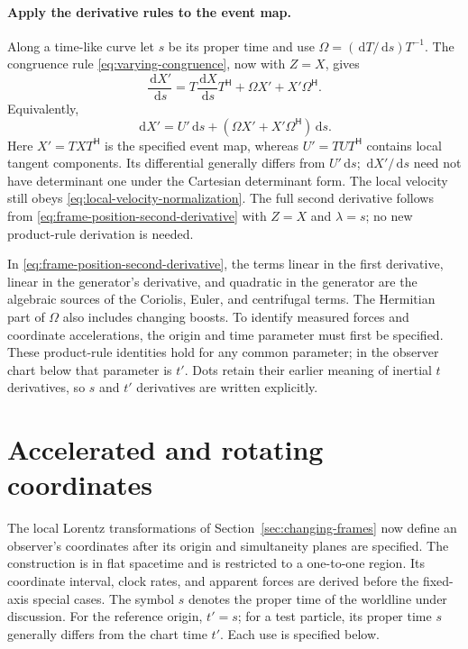 \documentclass[11pt]{article}
\newcommand{\pv}[1]{{#1}}
\newcommand{\pvGreek}[1]{{#1}}
\newcommand{\pT}{\pv{T}}
\newcommand{\pU}{\pv{U}}
\newcommand{\pX}{\pv{X}}
\newcommand{\pZ}{\pv{Z}}
\newcommand{\pvOmega}{\pvGreek{\Omega}}
\numberwithin{equation}{section}
\newcommand{\dd}{\,\mathrm d}
\begin{document}
\paragraph{Apply the derivative rules to the event map.}
Along a time-like curve let $s$ be its proper time and use
$\pvOmega=(\dd\pT/\dd s)\pT^{-1}$.
The congruence rule \eqref{eq:varying-congruence}, now with
$\pZ=\pX$, gives
\begin{equation}
 \frac{\dd\pX'}{\dd s}
 =\pT\frac{\dd\pX}{\dd s}\pT^{\mathsf H}
  +\pvOmega\pX'+\pX'\pvOmega^{\mathsf H}.
 \label{eq:frame-position-first-derivative}
\end{equation}
Equivalently,
\[
 \dd\pX'=\pU'\dd s
 +(\pvOmega\pX'+\pX'\pvOmega^{\mathsf H})\dd s.
\]
Here $\pX'=\pT\pX\pT^{\mathsf H}$ is the specified event map,
whereas $\pU'=\pT\pU\pT^{\mathsf H}$ contains local tangent
components. Its differential generally differs from $\pU'\dd s$;
$\dd\pX'/\dd s$ need not have determinant one under the Cartesian
determinant form. The local velocity still obeys
\eqref{eq:local-velocity-normalization}.
The full second derivative follows from
\eqref{eq:frame-position-second-derivative} with $\pZ=\pX$ and
$\lambda=s$; no new product-rule derivation is needed.

In \eqref{eq:frame-position-second-derivative}, the terms linear in the first derivative, linear in the generator's
derivative, and quadratic in the generator are the algebraic sources
of the Coriolis, Euler, and centrifugal terms. The Hermitian part of
$\pvOmega$ also includes changing boosts. To identify measured forces
and coordinate accelerations, the origin and time parameter must first
be specified. These product-rule identities hold for any common
parameter; in the observer chart below that parameter is $t'$.
Dots retain their earlier meaning of inertial $t$ derivatives, so
$s$ and $t'$ derivatives are written explicitly.

\section{Accelerated and rotating coordinates}
\label{sec:observer-coordinates}

The local Lorentz transformations of Section~\ref{sec:changing-frames}
now define an observer's coordinates after its origin and simultaneity
planes are specified. The construction is in flat spacetime and is
restricted to a one-to-one region. Its coordinate interval, clock rates,
and apparent forces are derived before the fixed-axis special cases.
The symbol $s$ denotes the proper time of the worldline under discussion.
For the reference origin, $t'=s$; for a test particle, its proper time
$s$ generally differs from the chart time $t'$. Each use is specified below.
\end{document}
